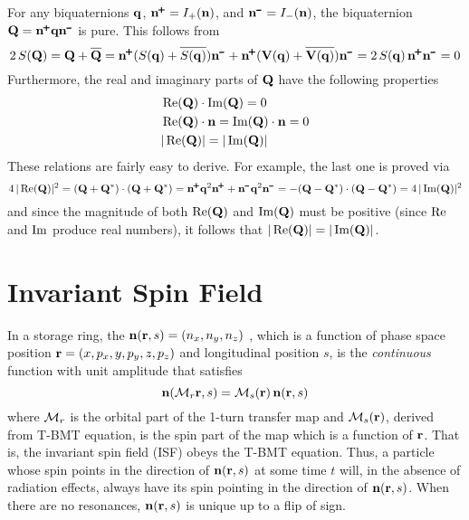 For any biquaternions ${\bf q}$, $\bfn^\ppls = I_+(\bfn)$, and $\bfn^\mmin = I_-(\bfn)$, the biquaternion $\bfQ =
\bfn^\ppls \bfq \bfn^\mmin$ is pure. This follows from
\begin{equation}
  2 \, S(\bfQ) = \bfQ + \BAR\bfQ = 
  \bfn^\ppls (S(\bfq) + \BAR{S(\bfq)}) \bfn^\mmin + \bfn^\ppls (\bfV(\bfq) + \BAR{\bfV(\bfq)}) \bfn^\mmin
  = 2 \, S(\bfq) \, \bfn^\ppls \bfn^\mmin = 0
  \label{2sgg}
\end{equation}
Furthermore, the real and imaginary parts of ${\bf Q}$ have the following properties
\begin{align}
  & \operatorname{Re}({\bf Q}) \cdot \operatorname{Im}({\bf Q}) = 0 \nonumber \\
  & \operatorname{Re}({\bf Q}) \cdot {\bf n} = \operatorname{Im}({\bf Q}) \cdot {\bf n} = 0 
  \label{GG0} \\
  & |\operatorname{Re}({\bf Q})| = |\operatorname{Im}({\bf Q})| \nonumber
\end{align}
These relations are fairly easy to derive. For example, the last one is proved via
\begin{equation}
  4 \, | \re(\bfQ) |^2 = (\bfQ + \bfQ^*) \cdot (\bfQ + \bfQ^*) =
  \bfn^\ppls \bfq^2 \bfn^\ppls + \bfn^\mmin \bfq^2 \bfn^\mmin =
  -(\bfQ - \bfQ^*) \cdot (\bfQ - \bfQ^*) =
  4 \, | \im(\bfQ) |^2
  \label{4ggg}
\end{equation}
and since the magnitude of both $\operatorname{Re}({\bf Q})$ and $\operatorname{Im}({\bf Q})$ must be positive (since $\operatorname{Re}$ and $\operatorname{Im}$
produce real numbers), it follows that $|\operatorname{Re}({\bf Q})| = |\operatorname{Im}({\bf Q})|$.


\section{Invariant Spin Field}
\label{s:isf}

In a storage ring, the  ${\bf n}({\bf r}, s) = (n_x, n_y, n_z)$
\cite{b:spin.hoff,b:duan15}, which is a function of phase space position ${\bf r} = (x, p_x, y, p_y, z,
p_z)$ and longitudinal position $s$, is the {\em continuous} function with unit amplitude that
satisfies
\begin{equation}
  {\bf n}({\cal M}_r {\bf r}, s) = {\cal M}_s({\bf r}) \, {\bf n}({\bf r}, s)
  \label{nmrs}
\end{equation}
where ${\cal M}_r$ is the orbital part of the 1-turn transfer map and ${\cal M}_s({\bf r})$, derived from
T-BMT equation, is the spin part of the map which is a function of ${\bf r}$. That is, the invariant
spin field (ISF) obeys the T-BMT equation. Thus, a particle whose spin points in the direction of
${\bf n}({\bf r}, s)$ at some time $t$ will, in the absence of radiation effects, always have its spin
pointing in the direction of ${\bf n}({\bf r}, s)$. When there are no resonances, ${\bf n}({\bf r}, s)$ is
unique up to a flip of sign. 

